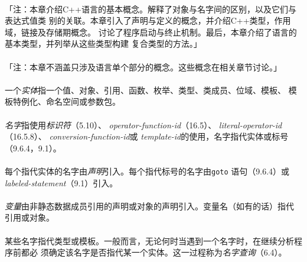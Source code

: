 
\paragraph{}
「注：本章介绍C++语言的基本概念。解释了对象与名字间的区别，以及它们与表达式值类
别的关联。本章引入了声明与定义的概念，并介绍C++类型，作用域，链接及存储期概念。
讨论了程序启动与终止机制。最后，本章介绍了语言的基本类型，并列举从这些类型构建
复合类型的方法。」

\paragraph{}
「注：本章不涵盖只涉及语言单个部分的概念。这些概念在相关章节讨论。」

\paragraph{}
一个\textit{实体}指一个值、对象、引用、函数、枚举、类型、类成员、位域、模板、
模板特例化、命名空间或参数包。

\paragraph{}
\textit{名字}指使用\textit{标识符}（5.10）、
\textit{operator-function-id}（16.5）、
\textit{literal-operator-id}（16.5.8）、
\textit{conversion-function-id}或
\textit{template-id}的使用，名字指代实体或标号（9.6.4，9.1）。

\paragraph{}
每个指代实体的名字由\textit{声明}引入。每个指代标号的名字由\texttt{goto}
语句（9.6.4）或\textit{labeled-statement}（9.1）引入。

\paragraph{}
\textit{变量}由非静态数据成员引用的声明或对象的声明引入。变量名（如有的话）指代
引用或对象。

\paragraph{}
某些名字指代类型或模板。一般而言，无论何时当遇到一个名字时，在继续分析程序前都必
须确定该名字是否指代某一个实体。这一过程称为\textit{名字查询}（6.4）。

